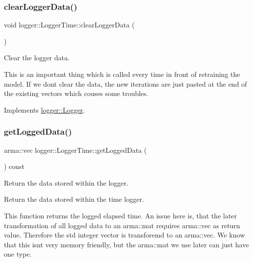 \subsubsection{\texorpdfstring{clear\+Logger\+Data()}{clearLoggerData()}}
{\footnotesize\ttfamily void logger\+::\+Logger\+Time\+::clear\+Logger\+Data (\begin{DoxyParamCaption}{ }\end{DoxyParamCaption})\hspace{0.3cm}{\ttfamily [virtual]}}



Clear the logger data. 

This is an important thing which is called every time in front of retraining the model. If we don\textquotesingle{}t clear the data, the new iterations are just pasted at the end of the existing vectors which couses some troubles. 

Implements \hyperlink{classlogger_1_1_logger_a8c68db2430fa84b67528bfa6ae45a516}{logger\+::\+Logger}.

\mbox{\label{classlogger_1_1_logger_time_a8723a078c86c1470208dccadffed5c1b}} 
\subsubsection{\texorpdfstring{get\+Logged\+Data()}{getLoggedData()}}
{\footnotesize\ttfamily arma\+::vec logger\+::\+Logger\+Time\+::get\+Logged\+Data (\begin{DoxyParamCaption}{ }\end{DoxyParamCaption}) const\hspace{0.3cm}{\ttfamily [virtual]}}



Return the data stored within the logger. 

Return the data stored within the time logger.

This function returns the logged elapsed time. An issue here is, that the later transformation of all logged data to an {\ttfamily arma\+::mat} requires {\ttfamily arma\+::vec} as return value. Therefore the std integer vector is transforemd to an {\ttfamily arma\+::vec}. We know that this isn\textquotesingle{}t very memory friendly, but the {\ttfamily arma\+::mat} we use later can just have one type.

